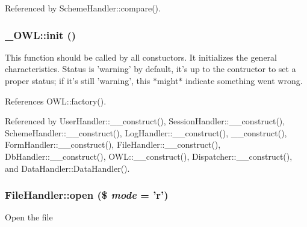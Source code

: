 Referenced by SchemeHandler::compare().

\subsubsection[{init}]{\setlength{\rightskip}{0pt plus 5cm}\_\-OWL::init ()}\label{class__OWL_ae0ef3ded56e8a6b34b6461e5a721cd3e}
This function should be called by all constuctors. It initializes the general characteristics. Status is 'warning' by default, it's up to the contructor to set a proper status; if it's still 'warning', this $\ast$might$\ast$ indicate something went wrong. 

References OWL::factory().



Referenced by UserHandler::\_\-\_\-construct(), SessionHandler::\_\-\_\-construct(), SchemeHandler::\_\-\_\-construct(), LogHandler::\_\-\_\-construct(), \_\-\_\-construct(), FormHandler::\_\-\_\-construct(), FileHandler::\_\-\_\-construct(), DbHandler::\_\-\_\-construct(), OWL::\_\-\_\-construct(), Dispatcher::\_\-\_\-construct(), and DataHandler::DataHandler().

\subsubsection[{open}]{\setlength{\rightskip}{0pt plus 5cm}FileHandler::open (\$ {\em mode} = {\ttfamily 'r'})}\label{classFileHandler_a2a650b033c4eb1f98ba47fb05ce7b454}
Open the file


